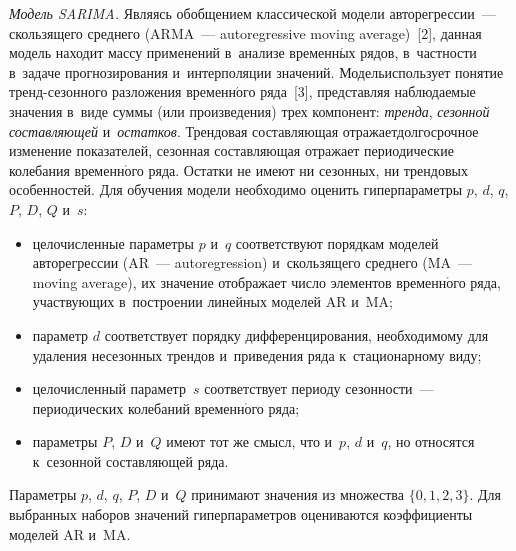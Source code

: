 \begin{multicols}{2}
      \textit{Модель SARIMA.} Являясь обобщением классической модели 
авторегрессии~--- скользящего среднего (ARMA~--- autoregressive
moving average)~[2], данная модель находит 
массу применений в~анализе временн$\acute{\mbox{ы}}$х рядов, в~част\-ности в~задаче 
прогнозирования и~интерполяции значений. Модель\linebreak использует понятие  
тренд-се\-зон\-но\-го разложения временн$\acute{\mbox{о}}$го ряда~[3], представляя 
наблюдаемые значения в~виде суммы (или произведения) трех компонент: 
\textit{тренда}, \textit{сезонной со\-став\-ля\-ющей} и~\textit{остатков}. Трендовая 
составляющая отражает\linebreak долгосрочное изменение показателей, сезонная 
составляющая отражает периодические колебания временн$\acute{\mbox{о}}$го ряда. Остатки не 
имеют ни сезонных, ни трендовых особенностей. Для обучения модели 
необходимо оценить гиперпараметры $p$, $d$, $q$, $P$, $D$, $Q$ и~$s$:
      \begin{itemize}
\item целочисленные параметры $p$ и~$q$ соответствуют порядкам моделей 
авторегрессии (AR~--- autoregression) и~скользящего среднего (MA~---
moving average), их значение отображает 
число элементов временн$\acute{\mbox{о}}$го ряда, участ\-ву\-ющих в~по\-стро\-ении линейных 
моделей AR и~MA;
\item параметр $d$ соответствует порядку дифференцирования, 
необходимому для удаления несезонных трендов и~приведения ряда 
к~стационарному виду;
\item целочисленный параметр~$s$ соответствует периоду сезонности~--- 
периодических колебаний временн$\acute{\mbox{о}}$го ряда;
\item параметры $P$, $D$ и~$Q$ имеют тот же смысл, что и~$p$, $d$ и~$q$, но 
относятся к~сезонной со\-став\-ля\-ющей ряда.
\end{itemize}
      
      Параметры $p$, $d$, $q$, $P$, $D$ и~$Q$ принимают значения из 
множества $\{0, 1, 2, 3\}$. Для выбранных наборов значений гиперпараметров 
оцениваются коэффициенты моделей AR и~MA. 
      

\end{multicols}
